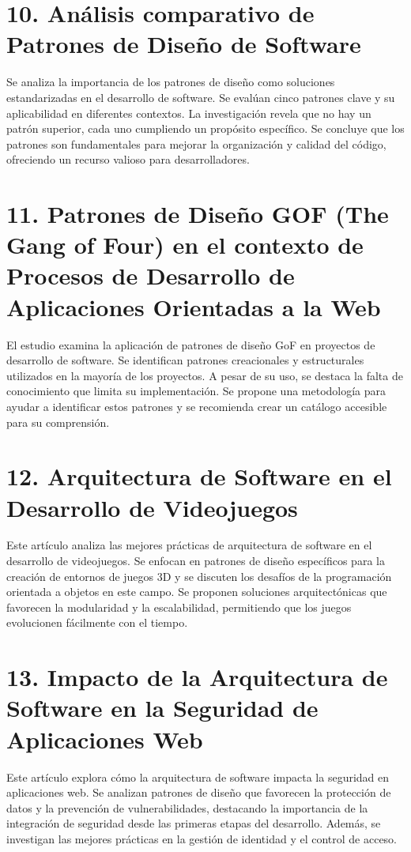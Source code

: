 \documentclass[twocolumn]{article}
\begin{document}
\printbibliography[heading=subbibliography]

\section*{10. Análisis comparativo de Patrones de Diseño de Software}
Se analiza la importancia de los patrones de diseño como soluciones estandarizadas en el desarrollo de software. Se evalúan cinco patrones clave y su aplicabilidad en diferentes contextos. La investigación revela que no hay un patrón superior, cada uno cumpliendo un propósito específico. Se concluye que los patrones son fundamentales para mejorar la organización y calidad del código, ofreciendo un recurso valioso para desarrolladores.


\printbibliography[heading=subbibliography]

\section*{11. Patrones de Diseño GOF (The Gang of Four) en el contexto de Procesos de Desarrollo de Aplicaciones Orientadas a la Web}
El estudio examina la aplicación de patrones de diseño GoF en proyectos de desarrollo de software. Se identifican patrones creacionales y estructurales utilizados en la mayoría de los proyectos. A pesar de su uso, se destaca la falta de conocimiento que limita su implementación. Se propone una metodología para ayudar a identificar estos patrones y se recomienda crear un catálogo accesible para su comprensión.


\printbibliography[heading=subbibliography]

\section*{12. Arquitectura de Software en el Desarrollo de Videojuegos}
Este artículo analiza las mejores prácticas de arquitectura de software en el desarrollo de videojuegos. Se enfocan en patrones de diseño específicos para la creación de entornos de juegos 3D y se discuten los desafíos de la programación orientada a objetos en este campo. Se proponen soluciones arquitectónicas que favorecen la modularidad y la escalabilidad, permitiendo que los juegos evolucionen fácilmente con el tiempo.


\printbibliography[heading=subbibliography]

\section*{13. Impacto de la Arquitectura de Software en la Seguridad de Aplicaciones Web}
Este artículo explora cómo la arquitectura de software impacta la seguridad en aplicaciones web. Se analizan patrones de diseño que favorecen la protección de datos y la prevención de vulnerabilidades, destacando la importancia de la integración de seguridad desde las primeras etapas del desarrollo. Además, se investigan las mejores prácticas en la gestión de identidad y el control de acceso.
\end{document}
